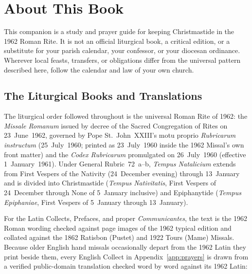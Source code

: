 \section{About This Book}\label{app:about}

This companion is a study and prayer guide for keeping Christmastide in the 1962
Roman Rite. It is not an official liturgical book, a critical edition, or a
substitute for your parish calendar, your confessor, or your diocesan ordinance.
Wherever local feasts, transfers, or obligations differ from the universal
pattern described here, follow the calendar and law of your own church.

\subsection{The Liturgical Books and Translations}

The liturgical order followed throughout is the universal Roman Rite of 1962:
the \textit{Missale Romanum} issued by decree of the Sacred Congregation of
Rites on 23~June~1962, governed by Pope St.~John~XXIII's motu proprio
\textit{Rubricarum instructum} (25~July~1960; printed as 23~July~1960 inside the
1962 Missal's own front matter) and the \textit{Codex Rubricarum} promulgated on
26~July~1960 (effective 1~January~1961). Under General Rubric~72~a--b,
\textit{Tempus Natalicium} extends from First Vespers of the Nativity
(24~December evening) through 13~January and is divided into Christmastide
(\textit{Tempus Nativitatis}, First Vespers of 24~December through None of
5~January inclusive) and Epiphanytide (\textit{Tempus Epiphaniae}, First Vespers
of 5~January through 13~January).

For the Latin Collects, Prefaces, and proper \textit{Communicantes}, the text is
the 1962 Roman wording checked against page images of the 1962 typical edition
and collated against the 1862 Ratisbon (Pustet) and 1922 Tours (Mame) Missals.
Because older English hand missals occasionally depart from the 1962 Latin they
print beside them, every English Collect in Appendix~\ref{app:prayers} is drawn
from a verified public-domain translation checked word by word against its 1962
Latin:

